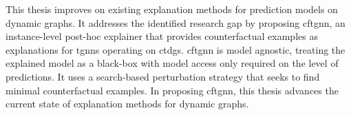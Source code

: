 This thesis improves on existing explanation methods for prediction models on dynamic graphs. It addresses the identified research gap by proposing \gls{cftgnn}, an instance-level post-hoc explainer that provides counterfactual examples as explanations for \glspl{tgnn} operating on \glspl{ctdg}. \gls{cftgnn} is model agnostic, treating the explained model as a black-box with model access only required on the level of predictions. It uses a search-based perturbation strategy that seeks to find minimal counterfactual examples. In proposing \gls{cftgnn}, this thesis advances the current state of explanation methods for dynamic graphs.



